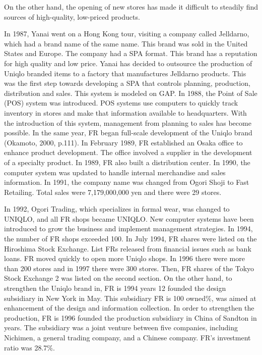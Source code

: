 \documentclass[12pt,]{article}
\begin{document}
On the other hand, the opening of new stores has made it difficult to
steadily find sources of high-quality, low-priced products.

In 1987, Yanai went on a Hong Kong tour, visiting a company called
Jelldarno, which had a brand name of the same name. This brand was sold
in the United States and Europe. The company had a SPA format. This
brand has a reputation for high quality and low price. Yanai has decided
to outsource the production of Uniqlo branded items to a factory that
manufactures Jelldarno products. This was the first step towards
developing a SPA that controls planning, production, distribution and
sales. This system is modeled on GAP. In 1988, the Point of Sale (POS)
system was introduced. POS systems use computers to quickly track
inventory in stores and make that information available to headquarters.
With the introduction of this system, management from planning to sales
has become possible. In the same year, FR began full-scale development
of the Uniqlo brand (Okamoto, 2000, p.111). In February 1989, FR
established an Osaka office to enhance product development. The office
involved a supplier in the development of a specialty product. In 1989,
FR also built a distribution center. In 1990, the computer system was
updated to handle internal merchandise and sales information. In 1991,
the company name was changed from Ogori Shoji to Fast Retailing. Total
sales were 7,179,000,000 yen and there were 29 stores.

In 1992, Ogori Trading, which specializes in formal wear, was changed to
UNIQLO, and all FR shops became UNIQLO. New computer systems have been
introduced to grow the business and implement management strategies. In
1994, the number of FR shops exceeded 100. In July 1994, FR shares were
listed on the Hiroshima Stock Exchange. List FRs released from financial
issues such as bank loans. FR moved quickly to open more Uniqlo shops.
In 1996 there were more than 200 stores and in 1997 there were 300
stores. Then, FR shares of the Tokyo Stock Exchange 2 was listed on the
second section. On the other hand, to strengthen the Uniqlo brand in, FR
is 1994 years 12 founded the design subsidiary in New York in May. This
subsidiary FR is 100 owned\%, was aimed at enhancement of the design and
information collection. In order to strengthen the production, FR is
1996 founded the production subsidiary in China of Sandton in years. The
subsidiary was a joint venture between five companies, including
Nichimen, a general trading company, and a Chinese company. FR's
investment ratio was 28.7\%.
\end{document}
